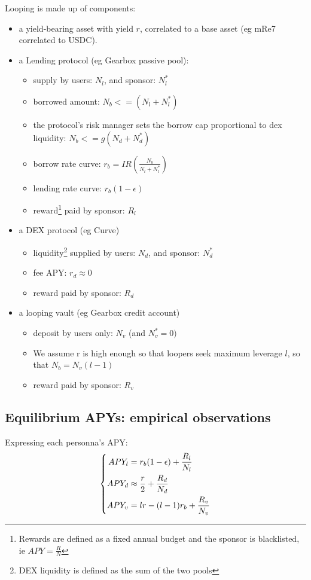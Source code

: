 \documentclass{article}
\begin{document}
Looping is made up of components:
    \begin{itemize}
        \item a yield-bearing asset with yield $r$, correlated to a base asset (eg mRe7 correlated to USDC).
        \item a Lending protocol (eg Gearbox passive pool):
        \begin{itemize}
            \item supply by users: $N_l$, and sponsor: $N_l^*$
            \item borrowed amount: $N_b<=(N_l+N_l^*)$
            \item the protocol's risk manager sets the borrow cap proportional to dex liquidity: $N_b<=g (N_d+N_d^*)$
            \item borrow rate curve: $r_b=IR(\frac{N_b}{N_l+N_l^*})$
            \item lending rate curve: $r_b(1-\epsilon)$
            \item reward\footnote{Rewards are defined as a fixed annual budget and the sponsor is blacklisted, ie $APY = \frac{R}{N}$} paid by sponsor: $R_l$
        \end{itemize}
        \item a DEX protocol (eg Curve)
        \begin{itemize}
            \item liquidity\footnote{DEX liquidity is defined as the sum of the two pools} supplied by users: $N_d$, and sponsor: $N_d^*$ 
            \item fee APY: $r_d\approx 0$
            \item reward paid by sponsor: $R_d$
        \end{itemize}
        \item a looping vault (eg Gearbox credit account)
        \begin{itemize}
            \item deposit by users only: $N_v$ (and $N_v^*=0)$
            \item We assume r is high enough so that loopers seek maximum leverage $l$, so that $N_b=N_v(l-1)$
            \item reward paid by sponsor: $R_v$
        \end{itemize}
    \end{itemize}

    \subsection{Equilibrium APYs: empirical observations}
    Expressing each personna's APY:
    \begin{equation*}
    \left\{
    \begin{aligned}
        APY_l &= r_b(1-\epsilon) + \frac{R_l}{N_l}\\
        APY_d &\approx \frac{r}{2}+\frac{R_d}{N_d}\\
        APY_v &= l \space r - (l-1)r_b + \frac{R_v}{N_v}
    \end{aligned}
    \right.
    \end{equation*}
    
\end{document}
